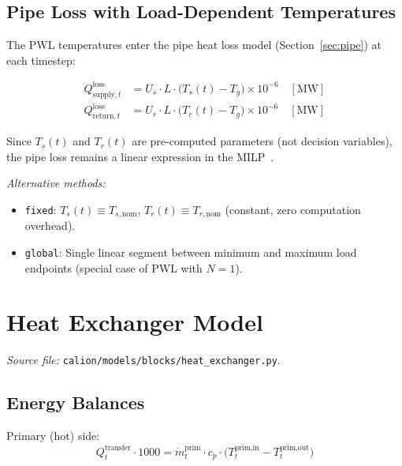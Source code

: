 \documentclass[a4paper,12pt]{article}
\begin{document}
\subsection{Pipe Loss with Load-Dependent Temperatures}

The PWL temperatures enter the pipe heat loss model (Section~\ref{sec:pipe}) at each
timestep:

\begin{align}
  Q^{\text{loss}}_{\text{supply},t}
    &= U_s \cdot L \cdot \bigl(T_s(t) - T_g\bigr) \times 10^{-6}
    \quad [\text{MW}]
    \tag{PWL-3a}
    \label{eq:pwl3a} \\
  Q^{\text{loss}}_{\text{return},t}
    &= U_r \cdot L \cdot \bigl(T_r(t) - T_g\bigr) \times 10^{-6}
    \quad [\text{MW}]
    \tag{PWL-3b}
    \label{eq:pwl3b}
\end{align}

Since $T_s(t)$ and $T_r(t)$ are pre-computed parameters (not decision variables),
the pipe loss remains a linear expression in the MILP~\cite{Vesterlund2017}.

\noindent\textit{Alternative methods:}
\begin{itemize}
  \item \texttt{fixed}: $T_s(t) \equiv T_{s,\text{nom}}$,\; $T_r(t) \equiv T_{r,\text{nom}}$
        (constant, zero computation overhead).
  \item \texttt{global}: Single linear segment between minimum and maximum load endpoints
        (special case of PWL with $N=1$).
\end{itemize}

\section{Heat Exchanger Model}
\label{sec:hx}

\textit{Source file:} \texttt{calion/models/blocks/heat\_exchanger.py}.

\subsection{Energy Balances}

\noindent Primary (hot) side:
\begin{equation}
  Q^{\text{transfer}}_{t} \cdot 1000
  = \dot{m}^{\text{prim}}_{t} \cdot c_p
    \cdot \bigl(T^{\text{prim,in}}_{t} - T^{\text{prim,out}}_{t}\bigr)
  \tag{HX-1}
  \label{eq:hx1}
\end{equation}
\end{document}
